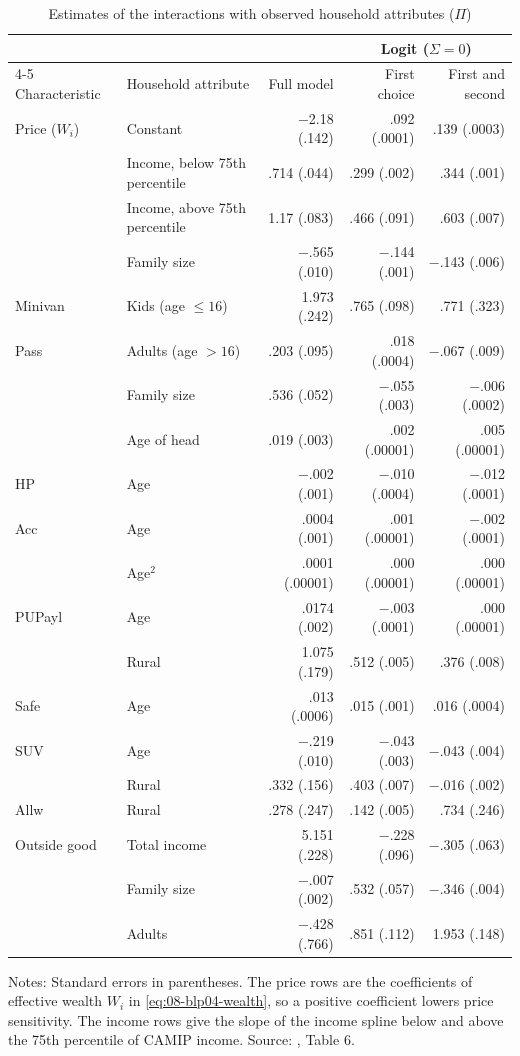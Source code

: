 \begin{table}[htbp]
\centering
\caption{Estimates of the interactions with observed household attributes ($\Pi$)}
\label{tab:08-blp04-pi}
\footnotesize
\begin{tabular}{@{}llrrr@{}}
\toprule
 & & & \multicolumn{2}{c}{Logit ($\Sigma = 0$)} \\
\cmidrule(l){4-5}
Characteristic & Household attribute & Full model & First choice & First and second \\
\midrule
Price ($W_i$) & Constant & $-$2.18 (.142) & .092 (.0001) & .139 (.0003) \\
 & Income, below 75th percentile & .714 (.044) & .299 (.002) & .344 (.001) \\
 & Income, above 75th percentile & 1.17 (.083) & .466 (.091) & .603 (.007) \\
 & Family size & $-$.565 (.010) & $-$.144 (.001) & $-$.143 (.006) \\
Minivan & Kids (age $\leq 16$) & 1.973 (.242) & .765 (.098) & .771 (.323) \\
Pass & Adults (age $>16$) & .203 (.095) & .018 (.0004) & $-$.067 (.009) \\
 & Family size & .536 (.052) & $-$.055 (.003) & $-$.006 (.0002) \\
 & Age of head & .019 (.003) & .002 (.00001) & .005 (.00001) \\
HP & Age & $-$.002 (.001) & $-$.010 (.0004) & $-$.012 (.0001) \\
Acc & Age & .0004 (.001) & .001 (.00001) & $-$.002 (.0001) \\
 & Age$^2$ & .0001 (.00001) & .000 (.00001) & .000 (.00001) \\
PUPayl & Age & .0174 (.002) & $-$.003 (.0001) & .000 (.00001) \\
 & Rural & 1.075 (.179) & .512 (.005) & .376 (.008) \\
Safe & Age & .013 (.0006) & .015 (.001) & .016 (.0004) \\
SUV & Age & $-$.219 (.010) & $-$.043 (.003) & $-$.043 (.004) \\
 & Rural & .332 (.156) & .403 (.007) & $-$.016 (.002) \\
Allw & Rural & .278 (.247) & .142 (.005) & .734 (.246) \\
Outside good & Total income & 5.151 (.228) & $-$.228 (.096) & $-$.305 (.063) \\
 & Family size & $-$.007 (.002) & .532 (.057) & $-$.346 (.004) \\
 & Adults & $-$.428 (.766) & .851 (.112) & 1.953 (.148) \\
\bottomrule
\end{tabular}

\smallskip
\begin{minipage}{0.92\linewidth}
\footnotesize Notes: Standard errors in parentheses. The price rows are the coefficients of effective wealth
$W_i$ in \cref{eq:08-blp04-wealth}, so a positive coefficient lowers price sensitivity. The income rows give the
slope of the income spline below and above the 75th percentile of CAMIP income. Source:
\citet{BerryLevinsohnPakes2004}, Table 6.
\end{minipage}
\end{table}

